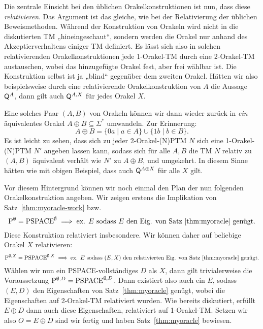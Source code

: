Die zentrale Einsicht bei den üblichen Orakelkonstruktionen ist nun, dass diese \emph{relativieren}.
Das Argument ist das gleiche, wie bei der Relativierung der üblichen Beweismethoden. Während der Konstruktion von Orakeln wird nicht in die diskutierten TM „hineingeschaut“, sondern werden die Orakel nur anhand des Akzeptierverhaltens einiger TM definiert.
Es lässt sich also in solchen relativierenden Orakelkonstruktionen jede 1-Orakel-TM durch eine 2-Orakel-TM austauschen, wobei das hinzugefügte Orakel fest, aber frei wählbar ist. Die Konstruktion selbst ist ja „blind“ gegenüber dem zweiten Orakel.
Hätten wir also beispielsweise durch eine relativierende Orakelkonstruktion von $A$ die Aussage $\hQ^A$, dann gilt auch $\hQ^{A,X}$ für jedes Orakel $X$.

Eine solches Paar $(A,B)$ von Orakeln können wir dann wieder zurück in \emph{ein} äquivalentes Orakel $A\oplus B\subseteq\Sigma^*$ umwandeln. Zur Erinnerung:
\[ A\oplus B = \{0a\mid a\in A\} \cup \{1b\mid b\in B\}. \]
Es ist leicht zu sehen, dass sich zu jeder 2-Orakel-(N)PTM $N$ sich eine 1-Orakel-(N)PTM $N'$ angeben lassen kann, sodass sich für alle $A, B$ die TM $N$ relativ zu $(A,B)$ äquivalent verhält wie $N'$ zu $A\oplus B$, und umgekehrt.
In diesem Sinne hätten wie mit obigen Beispiel, dass auch $\hQ^{A\oplus X}$ für alle $X$ gilt.

Vor diesem Hintergrund können wir noch einmal den Plan der nun folgenden Orakelkonstruktion angeben.
Wir zeigen erstens die Implikation von Satz~\ref{thm:myoracle-work} bzw.
\[  \P^\emptyset =\mathrm{PSPACE}^\emptyset \implies \text{ex. $E$ sodass $E$ den Eig. von Satz~\ref{thm:myoracle} genügt.}  \]
Diese Konstruktion relativiert insbesondere. Wir können daher auf beliebige Orakel $X$ relativieren:
\[  \P^{\emptyset,X} =\mathrm{PSPACE}^{\emptyset,X} \implies \text{ex. $E$ sodass $(E, X)$ den relativierten Eig. von Satz~\ref{thm:myoracle} genügt.}  \]
Wählen wir nun ein PSPACE-vollständiges $D$ als $X$, dann gilt trivialerweise die Voraussetzung $\P^{\emptyset,D}=\PSPACE^{\emptyset,D}$. Dann existiert also auch ein $E$, sodass $(E,D)$ den Eigenschaften von Satz~\ref{thm:myoracle} genügt, wobei die Eigenschaften auf 2-Orakel-TM relativiert wurden.
Wie bereits diskutiert, erfüllt $E\oplus D$ dann auch diese Eigenschaften, relativiert auf 1-Orakel-TM.
Setzen wir also $O=E\oplus D$ sind wir fertig und haben Satz~\ref{thm:myoracle} bewiesen.







